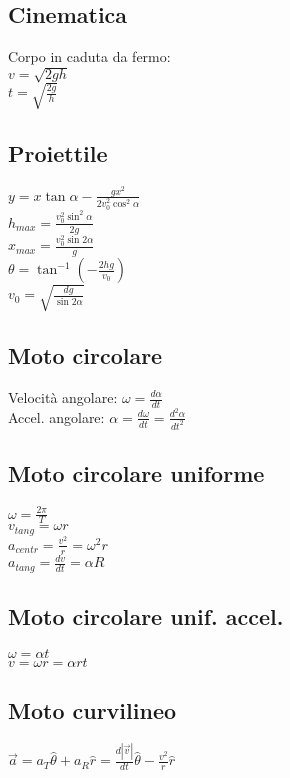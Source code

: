 \documentclass[8pt]{scrreprt}
\begin{document}
\begin{multicols*}{3}

\section*{Cinematica}
Corpo in caduta da fermo:\\
$v = \sqrt{2gh}$\\
$t = \sqrt{\frac{2g}{h}}$

\vspace{-3mm}
\subsection*{Proiettile}
$y = x \tan \alpha - \frac{gx^2}{2v_0^2 \cos^2 \alpha}$\\
$h_{max} = \frac{v_0^2 \sin^2 \alpha}{2g}$\\
$x_{max} = \frac{v_0^2 \sin 2\alpha}{g}$\\
$\theta = \tan^{-1} \left(-\frac{2hg}{v_0}\right)$\\
$v_0 = \sqrt{\frac{dg}{\sin 2\alpha}}$

\vspace{-3mm}
\subsection*{Moto circolare}
Velocità angolare: $\omega = \frac{d\alpha}{dt}$\\
Accel. angolare: $\alpha = \frac{d\omega}{dt} = \frac{d^2\alpha}{dt^2}$

\vspace{-3mm}
\subsection*{Moto circolare uniforme}
$\omega = \frac{2\pi}{T}$\\
$v_{tang} = \omega r$\\
$a_{centr} = \frac{v^2}{r} = \omega^2 r$\\
$a_{tang} = \frac{dv}{dt}= \alpha R$

\vspace{-3mm}
\subsection*{Moto circolare unif. accel.}
$\omega = \alpha t$\\
$v = \omega r = \alpha r t$

\vspace{-3mm}
\subsection*{Moto curvilineo}
$\overrightarrow{a} = a_T \hat{\theta} +a_R\hat{r} = \frac{d|\overrightarrow{v}|}{dt}\hat{\theta} - \frac{v^2}{r}\hat{r}$


\end{multicols*}
\end{document}
